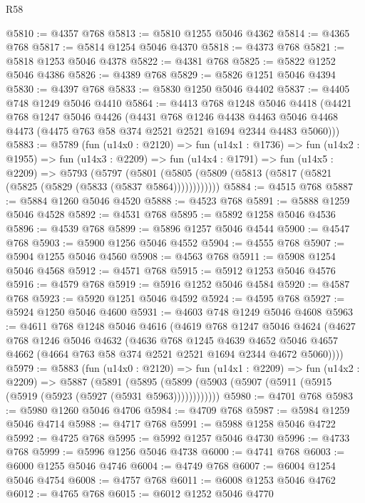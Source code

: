 \begin{lexlean}{R58}
\begin{coremodule}
@5810 := @4357 @768
@5813 := @5810 @1255 @5046 @4362
@5814 := @4365 @768
@5817 := @5814 @1254 @5046 @4370
@5818 := @4373 @768
@5821 := @5818 @1253 @5046 @4378
@5822 := @4381 @768
@5825 := @5822 @1252 @5046 @4386
@5826 := @4389 @768
@5829 := @5826 @1251 @5046 @4394
@5830 := @4397 @768
@5833 := @5830 @1250 @5046 @4402
@5837 := @4405 @748 @1249 @5046 @4410
@5864 := @4413
    @768
    @1248
    @5046
    @4418
    (@4421
      @768
      @1247
      @5046
      @4426
      (@4431
        @768
        @1246
        @4438
        @4463
        @5046
        @4468
        @4473
        (@4475 @763 @58 @374 @2521 @2521 @1694 @2344 @4483 @5060)))
@5883 := @5789
    (fun (u14x0 : @2120) =>
    fun (u14x1 : @1736) =>
    fun (u14x2 : @1955) =>
    fun (u14x3 : @2209) =>
    fun (u14x4 : @1791) =>
    fun (u14x5 : @2209) =>
    @5793
      (@5797 (@5801 (@5805 (@5809 (@5813 (@5817 (@5821 (@5825 (@5829 (@5833 (@5837 @5864))))))))))))
@5884 := @4515 @768
@5887 := @5884 @1260 @5046 @4520
@5888 := @4523 @768
@5891 := @5888 @1259 @5046 @4528
@5892 := @4531 @768
@5895 := @5892 @1258 @5046 @4536
@5896 := @4539 @768
@5899 := @5896 @1257 @5046 @4544
@5900 := @4547 @768
@5903 := @5900 @1256 @5046 @4552
@5904 := @4555 @768
@5907 := @5904 @1255 @5046 @4560
@5908 := @4563 @768
@5911 := @5908 @1254 @5046 @4568
@5912 := @4571 @768
@5915 := @5912 @1253 @5046 @4576
@5916 := @4579 @768
@5919 := @5916 @1252 @5046 @4584
@5920 := @4587 @768
@5923 := @5920 @1251 @5046 @4592
@5924 := @4595 @768
@5927 := @5924 @1250 @5046 @4600
@5931 := @4603 @748 @1249 @5046 @4608
@5963 := @4611
    @768
    @1248
    @5046
    @4616
    (@4619
      @768
      @1247
      @5046
      @4624
      (@4627
        @768
        @1246
        @5046
        @4632
        (@4636
          @768
          @1245
          @4639
          @4652
          @5046
          @4657
          @4662
          (@4664 @763 @58 @374 @2521 @2521 @1694 @2344 @4672 @5060))))
@5979 := @5883
    (fun (u14x0 : @2120) =>
    fun (u14x1 : @2209) =>
    fun (u14x2 : @2209) =>
    @5887
      (@5891 (@5895 (@5899 (@5903 (@5907 (@5911 (@5915 (@5919 (@5923 (@5927 (@5931 @5963))))))))))))
@5980 := @4701 @768
@5983 := @5980 @1260 @5046 @4706
@5984 := @4709 @768
@5987 := @5984 @1259 @5046 @4714
@5988 := @4717 @768
@5991 := @5988 @1258 @5046 @4722
@5992 := @4725 @768
@5995 := @5992 @1257 @5046 @4730
@5996 := @4733 @768
@5999 := @5996 @1256 @5046 @4738
@6000 := @4741 @768
@6003 := @6000 @1255 @5046 @4746
@6004 := @4749 @768
@6007 := @6004 @1254 @5046 @4754
@6008 := @4757 @768
@6011 := @6008 @1253 @5046 @4762
@6012 := @4765 @768
@6015 := @6012 @1252 @5046 @4770

\end{coremodule}
\end{lexlean}
